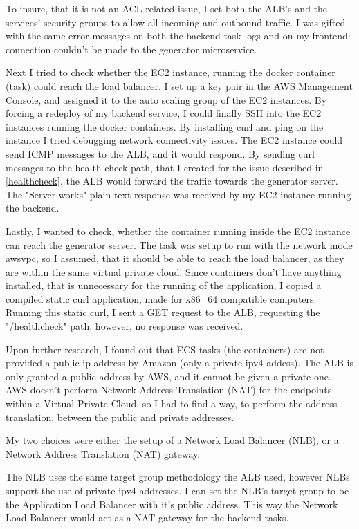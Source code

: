 		To insure, that it is not an ACL related issue, I set both the ALB's and the services' security groups to allow all incoming and outbound traffic.
		I was gifted with the same error messages on both the backend task logs
		and on my frontend: connection couldn't be made to the generator microservice.

		Next I tried to check whether the EC2 instance, running the docker container (task) could reach the load balancer. I set up a 
		key pair in the AWS Management Console, and assigned it to the auto scaling group of the EC2 instances. By forcing a redeploy of my 
		backend service, I could finally SSH into the EC2 instances running the docker containers. By installing curl and ping on the instance
		I tried debugging network connectivity issues. The EC2 instance could send ICMP messages to the ALB, and it would respond. By sending
		curl messages to the health check path, that I created for the issue described in \ref{healthcheck}, the ALB would forward the traffic
		towards the generator server. The "Server works" plain text response was received by my EC2 instance running the backend.

		Lastly, I wanted to check, whether the container running inside the EC2 instance can reach the generator server. The task was 
		setup to run with the network mode awsvpc, so I assumed, that it should be able to reach the load balancer, as they are within the 
		same virtual private cloud. Since containers don't have anything installed, that is unnecessary for the running of the application,
		I copied a compiled static curl application, made for x86\_64 compatible computers. Running this static curl, I sent a GET request
		to the ALB, requesting the "/healthcheck" path, however, no response was received.

		Upon further research, I found out that ECS tasks (the containers) are not provided a public ip address by Amazon (only a private ipv4 addess). 
		The ALB is only granted a public address by AWS, and it cannot be given a private one. AWS doesn't perform Network Address Translation (NAT)
		for the endpoints within a Virtual Private Cloud, so I had to find a way, to perform the address translation, between the public and private 
		addresses.

		My two choices were either the setup of a Network Load Balancer (NLB), or a Network Address Translation (NAT) gateway. 
		
		The NLB uses the same target group methodology the
		ALB used, however NLBs support the use of private ipv4 addresses. I can set the NLB's target group to be the Application Load Balancer 
		with it's public address. This way the Network Load Balancer would act as a NAT gateway for the backend tasks.

